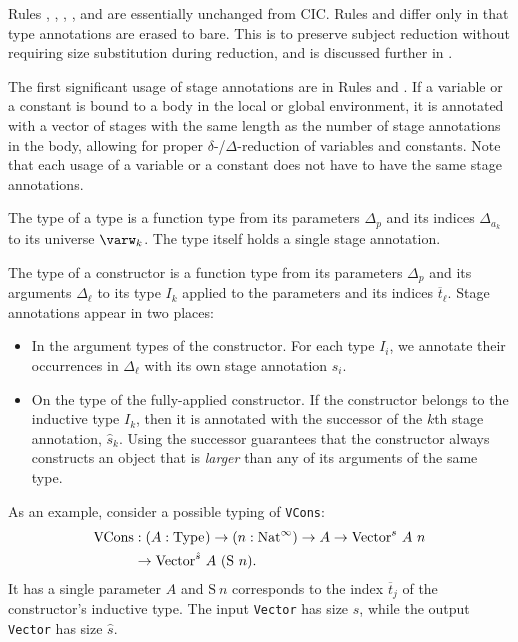 \documentclass[nonacm,screen,10pt]{acmart}
\begin{document}
Rules , , ,  , and  are essentially unchanged from CIC. Rules  and  differ only in that type annotations are erased to bare. This is to preserve subject reduction without requiring size substitution during reduction, and is discussed further in \cite{cic-hat-bar}.

The first significant usage of stage annotations are in Rules  and . If a variable or a constant is bound to a body in the local or global environment, it is annotated with a vector of stages with the same length as the number of stage annotations in the body, allowing for proper $\delta$-/$\Delta$-reduction of variables and constants. Note that each usage of a variable or a constant does not have to have the same stage annotations.

The type of a \coinductive type is a function type from its parameters $\Delta_p$ and its indices $\Delta_{a_k}$ to its universe $\varw_k$. The \coinductive type itself holds a single stage annotation.

The type of a constructor is a function type from its parameters $\Delta_p$ and its arguments $\Delta_\ell$ to its \coinductive type $I_k$ applied to the parameters and its indices $\overline{t}_\ell$. Stage annotations appear in two places:
\begin{itemize}
    \item In the argument types of the constructor. For each \coinductive type $I_i$, we annotate their occurrences in $\Delta_\ell$ with its own stage annotation $s_i$.
    \item On the \coinductive type of the fully-applied constructor. If the constructor belongs to the inductive type $I_k$, then it is annotated with the successor of the $k$th stage annotation, $\hat{s}_k$. Using the successor guarantees that the constructor always constructs an object that is \textit{larger} than any of its arguments of the same type.
\end{itemize}
As an example, consider a possible typing of \texttt{VCons}:
\begin{align*}
\text{VCons} &: (A: \text{Type}_{}) \to (n:\text{Nat}^\infty) \to A \to \text{Vector}^s\ A\ n \\
&\to \text{Vector}^{\hat{s}}\ A\ (\text{S}\ n).
\end{align*}
It has a single parameter $A$ and $\text{S}\ n$ corresponds to the index $\overline{t}_j$ of the constructor's inductive type. The input \texttt{Vector} has size $s$, while the output \texttt{Vector} has size $\hat{s}$.
\end{document}
